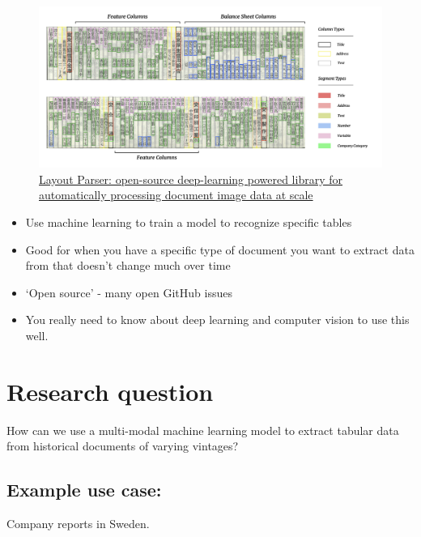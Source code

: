 \documentclass[
  letterpaper,
  DIV=11,
  numbers=noendperiod]{scrartcl}
\providecommand{\tightlist}{%
  \setlength{\itemsep}{0pt}\setlength{\parskip}{0pt}}\usepackage{longtable,booktabs,array}
\begin{document}
\begin{figure}

{\centering \includegraphics{assets/layout_parser.png}

}

\caption{\href{https://dell-research-harvard.github.io/resources/layout-parser}{Layout
Parser: open-source deep-learning powered library for automatically
processing document image data at scale}}

\end{figure}

\begin{itemize}
\tightlist
\item
  Use machine learning to train a model to recognize specific tables
\item
  Good for when you have a specific type of document you want to extract
  data from that doesn't change much over time
\item
  `Open source' - many open GitHub issues
\item
  You really need to know about deep learning and computer vision to use
  this well.
\end{itemize}

\hypertarget{sec-researchquestion}{%
\section{Research question}\label{sec-researchquestion}}

How can we use a multi-modal machine learning model to extract tabular
data from historical documents of varying vintages?

\hypertarget{example-use-case}{%
\subsection{Example use case:}\label{example-use-case}}

Company reports in Sweden.
\end{document}
